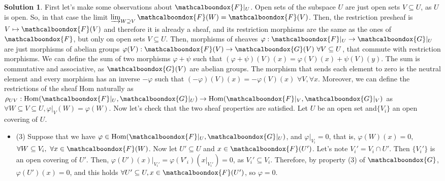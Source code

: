 \documentclass[12pt]{article}
\theoremstyle{definition}
\newtheorem*{sol}{Solution}
\newcommand{\sF}{\ensuremath{\mathcalboondox{F}}}
\newcommand{\sG}{\ensuremath{\mathcalboondox{G}}}
\begin{document}
\begin{sol}
	First let's make some observations about $\sF|_U$. Open sets of the subspace $U$ are just open sets $V \subseteq U$, as $U$ is open. So, in that case the limit $\varinjlim_{W \supseteq V} \sF(W) = \sF(V)$. Then, the restriction presheaf is $V \mapsto \sF(V)$ and therefore it is already a sheaf, and its restriction morphisms are the same as the ones of $\sF$, but only on open sets $V \subseteq U$. Then, morphisms of sheaves $\varphi: \sF|_U \to \sG|_U$ are just morphisms of abelian groups $\varphi(V): \sF(V) \to \sG(V) \, \, \forall V \subseteq U$, that commute with restriction morphisms. We can define the sum of two morphisms $\varphi + \psi$ such that $(\varphi + \psi)(V)(x) = \varphi(V)(x) + \psi(V)(y)$. The sum is commutative and associative, as $\sG(V)$ are abelian groups. The morphism that sends each element to zero is the neutral element and every morphism has an inverse $-\varphi$ such that $(-\varphi)(V)(x) = -\varphi(V)(x) \, \, \forall V, \forall x$. Moreover, we can define the restrictions of the sheaf Hom naturally as $\rho_{UV}: \mathrm{Hom}(\sF|_U, \sG|_U) \to \mathrm{Hom}(\sF|_V, \sG|_V)$ as $\forall W \subseteq V \subseteq U, \varphi|_V (W) = \varphi(W)$. Now let's check that the two sheaf properties are satisfied. Let $U$ be an open set and$\{V_i\}$ an open covering of $U$.
	\begin{itemize}
		\item (3) Suppose that we have $\varphi \in \mathrm{Hom}(\sF|_{U}, \sG|_U)$, and $\varphi|_{V_i} = 0$, that is, $\varphi(W)(x) = 0$, $\forall W \subseteq V_i, \, \, \forall x \in \sF(W)$. Now let $U' \subseteq U$ and $x \in \sF(U')$. Let's note $V_i' = V_i \cap U'$. Then $\{V_i'\}$ is an open covering of $U'$. Then, $\varphi(U')(x)|_{V_i'} = \varphi(V'_i)(x|_{V_i'}) = 0$, as $V_i' \subseteq V_i$. Therefore, by property (3) of $\sG$, $\varphi(U')(x) = 0$, and this holds $\forall U' \subseteq U, x \in \sF(U')$, so $\varphi = 0$.


\end{itemize}
\end{sol}
\end{document}
